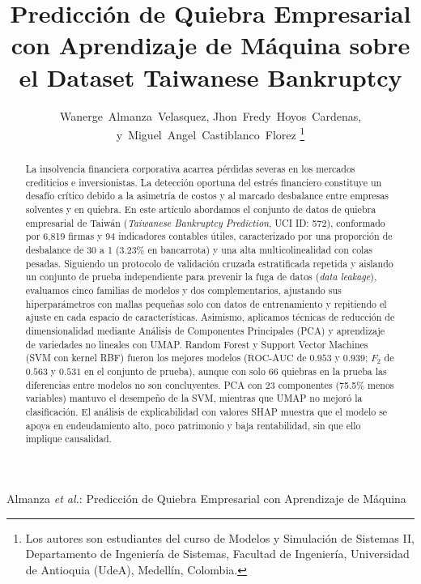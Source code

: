 \documentclass[journal]{IEEEtran}
\begin{document}
\title{Predicción de Quiebra Empresarial con Aprendizaje de Máquina sobre el Dataset Taiwanese Bankruptcy}

\author{Wanerge~Almanza~Velasquez,
        Jhon~Fredy~Hoyos~Cardenas,
        y~Miguel~Angel~Castiblanco~Florez%
\thanks{Los autores son estudiantes del curso de Modelos y Simulación de Sistemas II, Departamento de Ingeniería de Sistemas, Facultad de Ingeniería, Universidad de Antioquia (UdeA), Medellín, Colombia.}%
}

%
{Almanza \MakeLowercase{\textit{et al.}}: Predicción de Quiebra Empresarial con Aprendizaje de Máquina}

\maketitle

\begin{abstract}
La insolvencia financiera corporativa acarrea pérdidas severas en los mercados crediticios e inversionistas. La detección oportuna del estrés financiero constituye un desafío crítico debido a la asimetría de costos y al marcado desbalance entre empresas solventes y en quiebra. En este artículo abordamos el conjunto de datos de quiebra empresarial de Taiwán (\textit{Taiwanese Bankruptcy Prediction}, UCI ID: 572), conformado por 6,819 firmas y 94 indicadores contables útiles, caracterizado por una proporción de desbalance de 30 a 1 (3.23\% en bancarrota) y una alta multicolinealidad con colas pesadas. Siguiendo un protocolo de validación cruzada estratificada repetida y aislando un conjunto de prueba independiente para prevenir la fuga de datos (\textit{data leakage}), evaluamos cinco familias de modelos y dos complementarios, ajustando sus hiperparámetros con mallas pequeñas solo con datos de entrenamiento y repitiendo el ajuste en cada espacio de características. Asimismo, aplicamos técnicas de reducción de dimensionalidad mediante Análisis de Componentes Principales (PCA) y aprendizaje de variedades no lineales con UMAP. Random Forest y Support Vector Machines (SVM con kernel RBF) fueron los mejores modelos ($\text{ROC-AUC}$ de $0.953$ y $0.939$; $F_2$ de $0.563$ y $0.531$ en el conjunto de prueba), aunque con solo 66 quiebras en la prueba las diferencias entre modelos no son concluyentes. PCA con 23 componentes (75.5\% menos variables) mantuvo el desempeño de la SVM, mientras que UMAP no mejoró la clasificación. El análisis de explicabilidad con valores SHAP muestra que el modelo se apoya en endeudamiento alto, poco patrimonio y baja rentabilidad, sin que ello implique causalidad.
\end{abstract}
\end{document}
